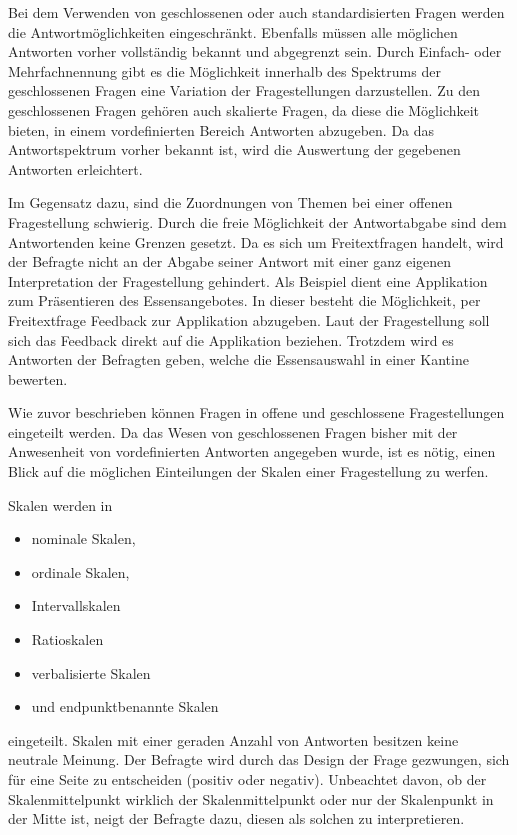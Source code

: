Bei dem Verwenden von geschlossenen oder auch standardisierten Fragen werden die Antwortmöglichkeiten eingeschränkt.
Ebenfalls müssen alle möglichen Antworten vorher vollständig bekannt und abgegrenzt sein.\autocite[Vgl.][S. 66]{2014Fragebogen} %
Durch Einfach- oder Mehrfachnennung gibt es die Möglichkeit innerhalb des Spektrums der geschlossenen Fragen eine Variation der Fragestellungen darzustellen.\autocite[Vgl.][S. 31]{2009Fragebogen} %
Zu den geschlossenen Fragen gehören auch skalierte Fragen, da diese die Möglichkeit bieten, in einem vordefinierten Bereich Antworten abzugeben.
Da das Antwortspektrum vorher bekannt ist, wird die Auswertung der gegebenen Antworten erleichtert.

Im Gegensatz dazu, sind die Zuordnungen von Themen bei einer offenen Fragestellung schwierig.
Durch die freie Möglichkeit der Antwortabgabe sind dem Antwortenden keine Grenzen gesetzt.
Da es sich um Freitextfragen handelt, wird der Befragte nicht an der Abgabe seiner Antwort mit einer ganz eigenen Interpretation der Fragestellung gehindert.
Als Beispiel dient eine Applikation zum Präsentieren des Essensangebotes.
In dieser besteht die Möglichkeit, per Freitextfrage Feedback zur Applikation abzugeben.
Laut der Fragestellung soll sich das Feedback direkt auf die Applikation beziehen.
Trotzdem wird es Antworten der Befragten geben, welche die Essensauswahl in einer Kantine bewerten.

Wie zuvor beschrieben können Fragen in offene und geschlossene Fragestellungen eingeteilt werden.
Da das Wesen von geschlossenen Fragen bisher mit der Anwesenheit von vordefinierten Antworten angegeben wurde, ist es nötig, einen Blick auf die möglichen Einteilungen der Skalen einer Fragestellung zu werfen.

Skalen werden in
\begin{itemize}
	\item nominale Skalen,
	\item ordinale Skalen,
	\item Intervallskalen
	\item Ratioskalen
	\item verbalisierte Skalen
	\item und endpunktbenannte Skalen
\end{itemize}

eingeteilt.\autocite[Vgl.][S. 71]{2014Fragebogen}
Skalen mit einer geraden Anzahl von Antworten besitzen keine neutrale Meinung.
Der Befragte wird durch das Design der Frage gezwungen, sich für eine Seite zu entscheiden (positiv oder negativ).
Unbeachtet davon, ob der Skalenmittelpunkt wirklich der Skalenmittelpunkt oder nur der Skalenpunkt in der Mitte ist, neigt der Befragte dazu, diesen als solchen zu interpretieren.\autocite[Vgl.][S. 83]{2014Fragebogen}%

